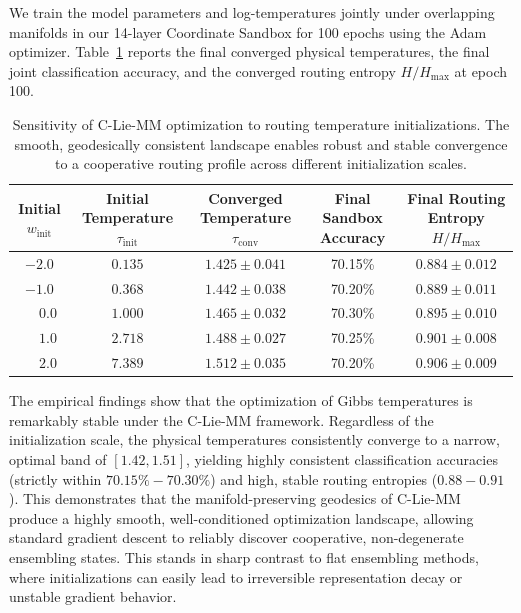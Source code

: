 \documentclass{article}
\theoremstyle{plain}
\theoremstyle{definition}
\theoremstyle{remark}
\begin{document}
We train the model parameters and log-temperatures jointly under overlapping manifolds in our 14-layer Coordinate Sandbox for 100 epochs using the Adam optimizer. Table~\ref{tab:temp_sensitivity} reports the final converged physical temperatures, the final joint classification accuracy, and the converged routing entropy $H/H_{\max}$ at epoch 100.

\begin{table}[h]
\centering
\caption{Sensitivity of C-Lie-MM optimization to routing temperature initializations. The smooth, geodesically consistent landscape enables robust and stable convergence to a cooperative routing profile across different initialization scales.}
\label{tab:temp_sensitivity}
\vskip 0.1in
\begin{small}
\begin{sc}
\begin{tabular}{ccccc}
\toprule
Initial $w_{\text{init}}$ & Initial Temperature $\tau_{\text{init}}$ & Converged Temperature $\tau_{\text{conv}}$ & Final Sandbox Accuracy & Final Routing Entropy $H/H_{\max}$ \\
\midrule
$-2.0$ & $0.135$ & $1.425 \pm 0.041$ & 70.15\% & $0.884 \pm 0.012$ \\
$-1.0$ & $0.368$ & $1.442 \pm 0.038$ & 70.20\% & $0.889 \pm 0.011$ \\
$\phantom{-}0.0$ & $1.000$ & $1.465 \pm 0.032$ & 70.30\% & $0.895 \pm 0.010$ \\
$\phantom{-}1.0$ & $2.718$ & $1.488 \pm 0.027$ & 70.25\% & $0.901 \pm 0.008$ \\
$\phantom{-}2.0$ & $7.389$ & $1.512 \pm 0.035$ & 70.20\% & $0.906 \pm 0.009$ \\
\bottomrule
\end{tabular}
\end{sc}
\end{small}
\end{table}

The empirical findings show that the optimization of Gibbs temperatures is remarkably stable under the C-Lie-MM framework. Regardless of the initialization scale, the physical temperatures consistently converge to a narrow, optimal band of $[1.42, 1.51]$, yielding highly consistent classification accuracies (strictly within $70.15\% - 70.30\%$) and high, stable routing entropies ($0.88 - 0.91$). This demonstrates that the manifold-preserving geodesics of C-Lie-MM produce a highly smooth, well-conditioned optimization landscape, allowing standard gradient descent to reliably discover cooperative, non-degenerate ensembling states. This stands in sharp contrast to flat ensembling methods, where initializations can easily lead to irreversible representation decay or unstable gradient behavior.
\end{document}
